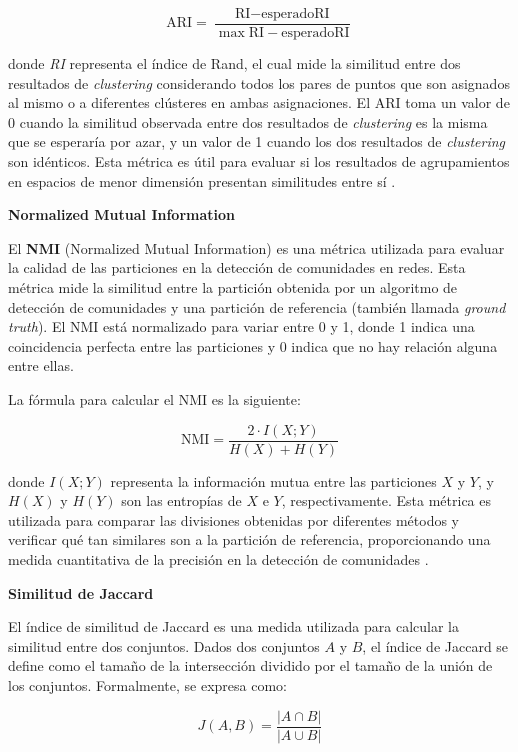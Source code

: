 \documentclass[11pt,a4paper,twoside,openany]{tesis}
\begin{document}
\begin{equation}
\text{ARI} = \frac{\text{RI} - \text{esperadoRI}}{\max \text{RI} - \text{esperadoRI}}
\end{equation}

donde \textit{RI} representa el índice de Rand, el cual mide la similitud entre dos resultados de \emph{clustering} considerando todos los pares de puntos que son asignados al mismo o a diferentes clústeres en ambas asignaciones. El ARI toma un valor de 0 cuando la similitud observada entre dos resultados de \emph{clustering} es la misma que se esperaría por azar, y un valor de 1 cuando los dos resultados de \emph{clustering} son idénticos. Esta métrica es útil para evaluar si los resultados de agrupamientos en espacios de menor dimensión presentan similitudes entre sí \cite{ari}.


\textbf{Normalized Mutual Information}

El \textbf{NMI} (Normalized Mutual Information) es una métrica utilizada para evaluar la calidad de las particiones en la detección de comunidades en redes. Esta métrica mide la similitud entre la partición obtenida por un algoritmo de detección de comunidades y una partición de referencia (también llamada \emph{ground truth}). El NMI está normalizado para variar entre 0 y 1, donde 1 indica una coincidencia perfecta entre las particiones y 0 indica que no hay relación alguna entre ellas.

La fórmula para calcular el NMI es la siguiente:

\[
\text{NMI} = \frac{2 \cdot I(X; Y)}{H(X) + H(Y)}
\]

donde \( I(X; Y) \) representa la información mutua entre las particiones \(X\) y \(Y\), y \( H(X) \) y \( H(Y) \) son las entropías de \(X\) e \(Y\), respectivamente. Esta métrica es utilizada para comparar las divisiones obtenidas por diferentes métodos y verificar qué tan similares son a la partición de referencia, proporcionando una medida cuantitativa de la precisión en la detección de comunidades \cite{nmi}.

\textbf{Similitud de Jaccard}

El índice de similitud de Jaccard es una medida utilizada para calcular la similitud entre dos conjuntos. Dados dos conjuntos \( A \) y \( B \), el índice de Jaccard se define como el tamaño de la intersección dividido por el tamaño de la unión de los conjuntos. Formalmente, se expresa como:

\[
J(A, B) = \frac{|A \cap B|}{|A \cup B|}
\]
\end{document}
